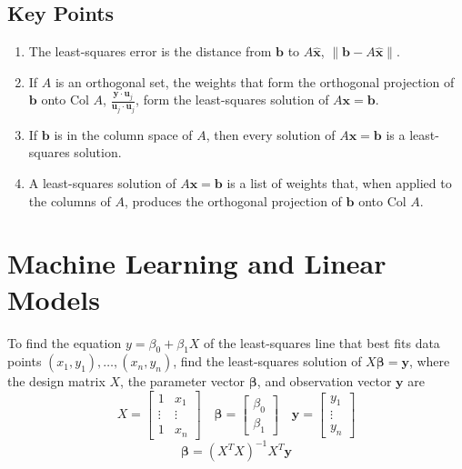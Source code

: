 \documentclass{article}
\begin{document}
\subsection*{Key Points}
\begin{enumerate}
    \item The least-squares error is the distance from $\mathbf{b}$ to $A\mathbf{\hat{x}}$,
    $\|\mathbf{b}-A\mathbf{\hat{x}}\|$.
    \item If $A$ is an orthogonal set, the weights that form the orthogonal projection of
    $\mathbf{b}$ onto $\text{Col }A$, $\frac{\mathbf{y}\cdot\mathbf{u}_j}{\mathbf{u}_j\cdot
    \mathbf{u}_j}$, form the least-squares solution of $A\mathbf{x}=\mathbf{b}$.
    \item If $\mathbf{b}$ is in the column space of $A$, then every solution of
    $A\mathbf{x}=\mathbf{b}$ is a least-squares solution.
    \item A least-squares solution of $A\mathbf{x}=\mathbf{b}$ is a list of weights that, when applied to the columns of $A$, produces the orthogonal projection of $\mathbf{b}$ onto Col $A$.
\end{enumerate}

\pagebreak

\section*{Machine Learning and Linear Models}

To find the equation $y=\beta_0 + \beta_1 X$ of the least-squares line that best fits data points
$(x_1, y_1), \ldots, (x_n, y_n)$, find the least-squares solution of $X\mathbf{\beta}=\mathbf{y}$,
where the design matrix $X$, the parameter vector $\mathbf{\beta}$, and observation vector
$\mathbf{y}$ are
\[X=\begin{bmatrix}
    1 & x_1 \\ 
    \vdots & \vdots \\
    1 & x_n
\end{bmatrix}\quad \mathbf{\beta} = \begin{bmatrix}
    \beta_0 \\
    \beta_1
\end{bmatrix}\quad \mathbf{y} = \begin{bmatrix}
    y_1 \\
    \vdots \\
    y_n
\end{bmatrix}\]
\[\mathbf{\beta}={(X^T X)}^{-1} X^T \mathbf{y}\]
\end{document}
